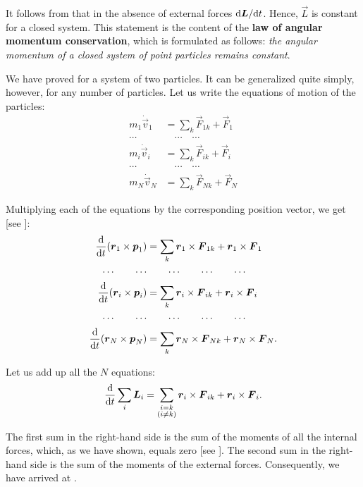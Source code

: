 It follows from  that in the absence of external forces $\mathrm{d}\boldsymbol{L}/\mathrm{d} t$. Hence, $\vec{L}$ is constant for a closed system. This statement is the content of the \textbf{law of angular momentum conservation}, which is formulated as follows: \textit{the angular momentum of a closed system of point particles remains constant}.

We have proved  for a system of two particles. It can be generalized quite simply, however, for any number of particles. Let us write the equations of motion of the particles:
\begin{align*}
m_1\dot{\vec{v}}_1 &= \sum_k \vec{F}_{1k} + \vec{F}_1\\
\cdots & \quad\cdots \quad\cdots\\
m_i\dot{\vec{v}}_i &= \sum_k \vec{F}_{ik} + \vec{F}_i\\
\cdots & \quad\cdots \quad\cdots\\
m_N\dot{\vec{v}}_N &= \sum_k \vec{F}_{Nk} + \vec{F}_N
\end{align*}

\noindent
Multiplying each of the equations by the corresponding position vector, we get [see ]:
\begin{align*}
\frac{\mathrm{d}}{\mathrm{d} t}(\boldsymbol{r}_{1}\times\boldsymbol{p}_{1}) &= \sum_k \boldsymbol{r}_{1}\times\boldsymbol{F}_{1k} + \boldsymbol{r}_{1}\times\boldsymbol{F}_{1}\\
\cdots\quad\quad\cdots & \quad\quad\cdots \quad\quad\cdots \quad\quad\cdots\\
\frac{\mathrm{d}}{\mathrm{d} t}(\boldsymbol{r}_{i}\times\boldsymbol{p}_{i}) &= \sum_k \boldsymbol{r}_{i}\times\boldsymbol{F}_{ik} + \boldsymbol{r}_{i}\times\boldsymbol{F}_{i}\\
\cdots\quad\quad\cdots & \quad\quad\cdots \quad\quad\cdots \quad\quad\cdots\\
\frac{\mathrm{d}}{\mathrm{d} t}(\boldsymbol{r}_{N}\times\boldsymbol{p}_{N}) &= \sum_k \boldsymbol{r}_{N}\times\boldsymbol{F}_{Nk} + \boldsymbol{r}_{N}\times\boldsymbol{F}_{N}.
\end{align*}

\noindent
Let us add up all the $N$ equations:
\begin{equation*}
\frac{\mathrm{d}}{\mathrm{d} t} \sum_i \boldsymbol{L}_i = \sum_{\substack{i=k\\(i\neq k)}} \boldsymbol{r}_{i}\times\boldsymbol{F}_{ik} + \boldsymbol{r}_{i}\times\boldsymbol{F}_{i}.
\end{equation*}

\noindent
The first sum in the right-hand side is the sum of the moments of all the internal forces, which, as we have shown, equals zero [see ]. The second sum in the right-hand side is the sum of the moments of the external forces. Consequently, we have arrived at .

